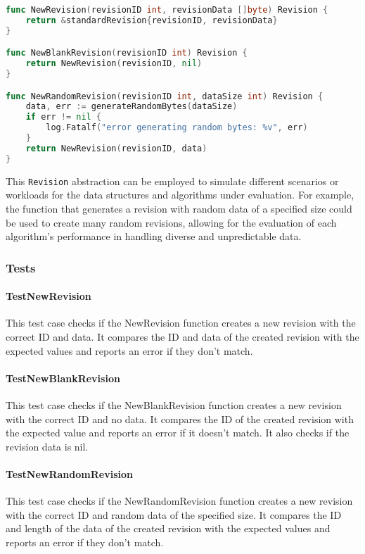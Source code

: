 \begin{lstlisting}[language=Go]
func NewRevision(revisionID int, revisionData []byte) Revision {
	return &standardRevision{revisionID, revisionData}
}

func NewBlankRevision(revisionID int) Revision {
	return NewRevision(revisionID, nil)
}

func NewRandomRevision(revisionID int, dataSize int) Revision {
	data, err := generateRandomBytes(dataSize)
	if err != nil {
		log.Fatalf("error generating random bytes: %v", err)
	}
	return NewRevision(revisionID, data)
}
\end{lstlisting}
\medskip

This \lstinline{Revision} abstraction can be employed to simulate different scenarios or workloads for the data structures and algorithms under evaluation. For example, the function that generates a revision with random data of a specified size could be used to create many random revisions, allowing for the evaluation of each algorithm's performance in handling diverse and unpredictable data.

\subsubsection*{Tests}
\paragraph{TestNewRevision}
This test case checks if the NewRevision function creates a new revision with the correct ID and data. It compares the ID and data of the created revision with the expected values and reports an error if they don't match.

\paragraph{TestNewBlankRevision}
This test case checks if the NewBlankRevision function creates a new revision with the correct ID and no data. It compares the ID of the created revision with the expected value and reports an error if it doesn't match. It also checks if the revision data is nil.

\paragraph{TestNewRandomRevision}
This test case checks if the NewRandomRevision function creates a new revision with the correct ID and random data of the specified size. It compares the ID and length of the data of the created revision with the expected values and reports an error if they don't match.

